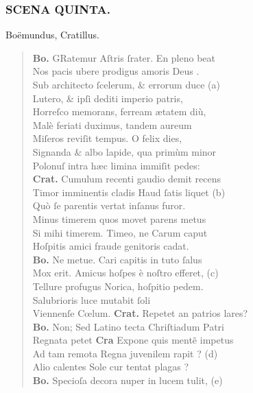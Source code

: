 \documentclass[a4paper,12pt]{article}
\begin{document}
\subsubsection{SCENA QUINTA.}
\label{sec:orge5cd87e}
Boëmundus, Cratillus.
\begin{verse}
\textbf{Bo.} GRatemur Aſtris ſrater. En pleno beat\\[0pt]
Nos pacis ubere prodigus amoris Deus .\\[0pt]
Sub architecto ſcelerum, \& errorum duce (a)\footnotemark\\[0pt]
Lutero, \& ipſi dediti imperio patris,\\[0pt]
Horreſco memorans, ferream ætatem diù,\\[0pt]
Malè feriati duximus, tandem aureum\\[0pt]
Miſeros reviſit tempus. O felix dies,\\[0pt]
Signanda \& albo lapide, qua primùm minor\\[0pt]
Polonuſ intra hæc limina immiſit pedes:\\[0pt]
\textbf{Crat.} Cumulum recenti gaudio demit recens\\[0pt]
Timor imminentis cladis Haud ſatis liquet (b)\footnotemark\\[0pt]
Quò ſe parentis vertat inſanus furor.\\[0pt]
Minus timerem quos movet parens metus\\[0pt]
Si mihi timerem. Timeo, ne Carum caput\\[0pt]
Hoſpitis amici fraude genitoris cadat.\\[0pt]
\textbf{Bo.} Ne metue. Cari capitis in tuto ſalus\\[0pt]
Mox erit. Amicus hoſpes è noſtro efferet, (c)\footnotemark\\[0pt]
Tellure profugus Norica, hoſpitio pedem.\\[0pt]
Salubrioris luce mutabit ſoli\\[0pt]
Viennenſe Cœlum. \textbf{Crat.} Repetet an patrios lares?\\[0pt]
\textbf{Bo.} Non; Sed Latino tecta Chriſtiadum Patri\\[0pt]
Regnata petet \textbf{Cra} Expone quis mentẽ impetus\\[0pt]
Ad tam remota Regna juvenilem rapit ? (d)\footnotemark\\[0pt]
Alio calentes Sole cur tentat plagas ?\\[0pt]
\textbf{Bo.} Specioſa decora nuper in lucem tulit, (e)\footnotemark\\[0pt]

\end{verse}
\end{document}
